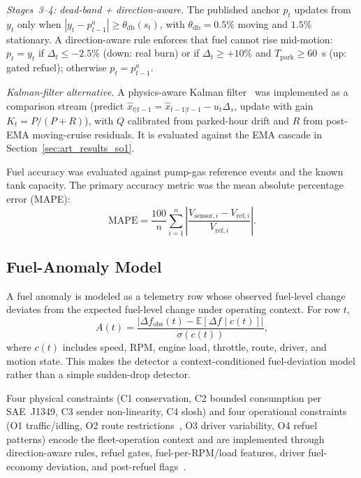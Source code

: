 \documentclass[10pt,journal]{IEEEtran}
\begin{document}
\emph{Stages~3--4: dead-band + direction-aware.} The published anchor $p_t$ updates from $y_t$ only when $|y_t - p^{a}_{t-1}| \geq \theta_{\mathrm{db}}(s_t)$, with $\theta_{\mathrm{db}} = 0.5\%$ moving and $1.5\%$ stationary. A direction-aware rule enforces that fuel cannot rise mid-motion: $p_t{=}y_t$ if $\Delta_t \leq -2.5\%$ (down: real burn) or if $\Delta_t \geq +10\%$ and $T_{\mathrm{park}}\geq60$~s (up: gated refuel); otherwise $p_t{=}p^{a}_{t-1}$.

\emph{Kalman-filter alternative.} A physics-aware Kalman filter~\cite{kalman1960new} was implemented as a comparison stream (predict $\hat{x}_{t|t-1} = \hat{x}_{t-1|t-1} - u_t\Delta_s$, update with gain $K_t = P/(P+R)$), with $Q$ calibrated from parked-hour drift and $R$ from post-EMA moving-cruise residuals. It is evaluated against the EMA cascade in Section~\ref{sec:art_results_so1}.

Fuel accuracy was evaluated against pump-gas reference events and the known tank capacity. The primary accuracy metric was the mean absolute percentage error (MAPE):
\begin{equation}
\mathrm{MAPE} = \frac{100}{n}\sum_{i=1}^{n}\left|\frac{V_{\mathrm{sensor},i}-V_{\mathrm{ref},i}}{V_{\mathrm{ref},i}}\right|.
\label{eq:art-mape}
\end{equation}

\subsection{Fuel-Anomaly Model}
A fuel anomaly is modeled as a telemetry row whose observed fuel-level change deviates from the expected fuel-level change under operating context. For row $t$,
\begin{equation}
A(t)=
\frac{\left|\Delta f_{\mathrm{obs}}(t)-\mathbb{E}[\Delta f\mid c(t)]\right|}
{\sigma(c(t))},
\label{eq:article-anomaly-model}
\end{equation}
where $c(t)$ includes speed, RPM, engine load, throttle, route, driver, and motion state. This makes the detector a context-conditioned fuel-deviation model rather than a simple sudden-drop detector.

Four physical constraints (C1 conservation, C2 bounded consumption per SAE~J1349, C3 sender non-linearity, C4 slosh) and four operational constraints (O1 traffic/idling, O2 route restrictions~\cite{jica2022metro_traffic}, O3 driver variability, O4 refuel patterns) encode the fleet-operation context and are implemented through direction-aware rules, refuel gates, fuel-per-RPM/load features, driver fuel-economy deviation, and post-refuel flags~\cite{barbado2022interpretable,turan2024detecting}.
\end{document}

